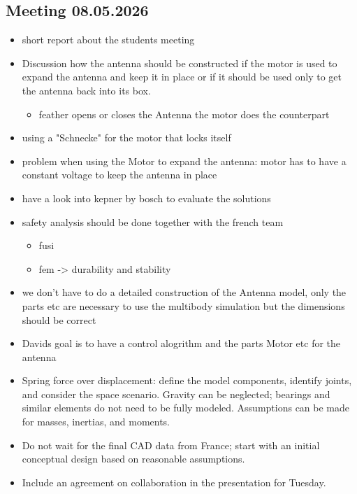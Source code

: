 	\subsection{Meeting 08.05.2026}
	\begin{itemize}
		\item short report about the students meeting 
		\item Discussion how the antenna should be constructed if the motor is used to expand the antenna and keep it in place or if it should be used only to get the antenna back into its box.
		\begin{itemize}
			\item feather opens or closes the Antenna the motor does the counterpart
		\end{itemize}
		\item using a "Schnecke" for the motor that locks itself
		\item problem when using the Motor to expand the antenna: motor has to have a constant voltage to keep the antenna in place
		\item have a look into kepner by bosch to evaluate the solutions 
		\item safety analysis should be done together with the french team 
		\begin{itemize}
			\item fusi 
			\item fem -> durability and stability
		\end{itemize}
		\item we don't have to do a detailed construction of the Antenna model, only the parts etc are necessary to use the multibody simulation but the dimensions should be correct
		\item Davids goal is to have a control alogrithm and the parts Motor etc for the antenna 
		
		\item Spring force over displacement: define the model components, identify joints, and consider the space scenario. Gravity can be neglected; bearings and similar elements do not need to be fully modeled. Assumptions can be made for masses, inertias, and moments.
		
		\item Do not wait for the final CAD data from France; start with an initial conceptual design based on reasonable assumptions.
		
		\item Include an agreement on collaboration in the presentation for Tuesday.
		

\end{itemize}
